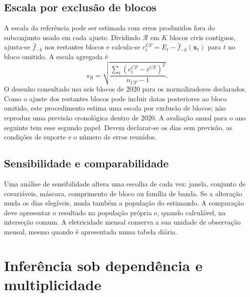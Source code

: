 \subsection{Escala por exclusão de blocos}
\label{sec:mat-crossfit}
A escala da referência pode ser estimada com erros produzidos fora do subconjunto usado em cada ajuste. Dividindo $\mathcal R$ em $K$ blocos civis contíguos, ajusta-se $\widehat f_{-k}$ nos restantes blocos e calcula-se $e_t^{CF}=E_t-\widehat f_{-k}(\boldsymbol x_t)$ para $t$ no bloco omitido. A escala agregada é
\begin{equation}
s_R=\sqrt{\frac{\sum_t(e_t^{CF}-\bar e^{CF})^2}{n_{CF}-1}}.
\label{eq:mat-crossfit}
\end{equation}
O desenho consultado usa seis blocos de 2020 para os normalizadores
declarados. Como o ajuste dos restantes blocos pode incluir datas posteriores ao bloco omitido, este procedimento estima uma escala por exclusão de blocos; não reproduz uma previsão cronológica dentro de 2020. A avaliação anual para o ano seguinte tem esse segundo papel. Devem declarar-se os dias sem previsão, as condições de suporte e o número de erros reunidos.

\subsection{Sensibilidade e comparabilidade}
\label{sec:mat-sensibilidade}
Uma análise de sensibilidade altera uma escolha de cada vez: janela, conjunto de covariáveis, máscara, comprimento de bloco ou família de banda. Se a alteração muda os dias elegíveis, muda também a população do estimando. A comparação deve apresentar o resultado na população própria e, quando calculável, na interseção comum. A eletricidade mensal conserva a sua unidade de observação mensal, mesmo quando é apresentada numa tabela diária.


\section{Inferência sob dependência e multiplicidade}
\label{sec:mat-inferencia}

